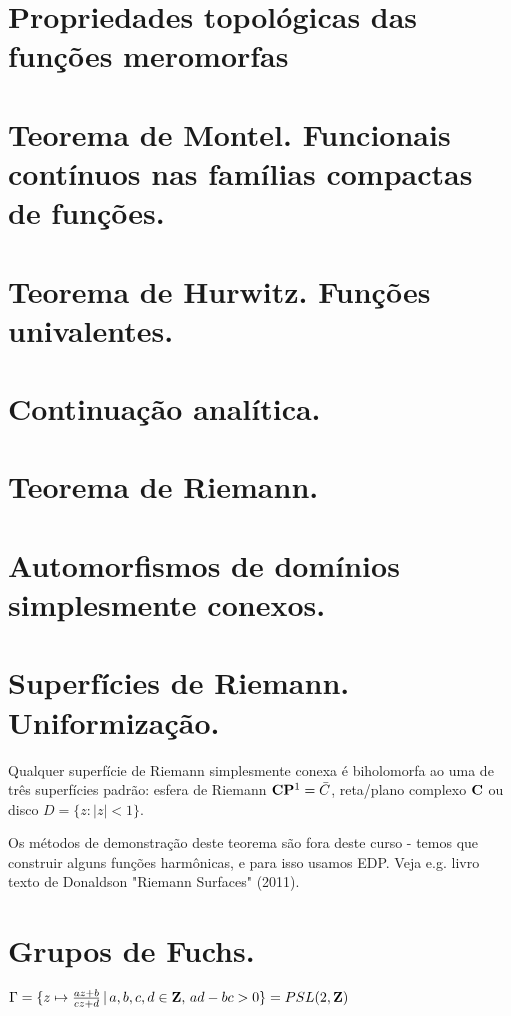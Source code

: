 \section{Propriedades topológicas das funções meromorfas}

\section{Teorema de Montel. Funcionais contínuos nas famílias compactas de funções.}

\section{Teorema de Hurwitz. Funções univalentes.}

\section{Continuação analítica.}

\section{Teorema de Riemann.}

\section{Automorfismos de domínios simplesmente conexos.}

\section{Superfícies de Riemann. Uniformização.}

\begin{teorema}
Qualquer superfície de Riemann simplesmente conexa é biholomorfa ao uma de três superfícies padrão:
esfera de Riemann $\mathbf{C}\mathbf{P}^1 = \bar{C}$, reta/plano complexo $\mathbf{C}$ ou disco $D = \{z : |z|<1\}$.
\end{teorema}
Os métodos de demonstração deste teorema são fora deste curso - temos que construir alguns funções
harmônicas, e para isso usamos EDP. Veja e.g. livro texto de Donaldson "Riemann Surfaces" (2011).

\section{Grupos de Fuchs.}

\begin{exem}
$\Gamma = \{ z \mapsto \frac{az+b}{cz+d} \,|\, a,b,c,d\in\mathbf{Z}, \, ad-bc>0 \} = PSL(2,\mathbf{Z})$
\end{exem}

